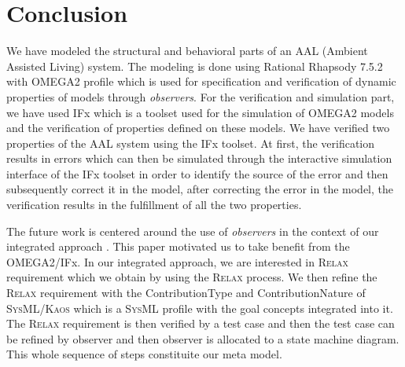 \documentclass[a4paper,twoside]{article}
\def\myrelax{\textsc{Relax}}                  %
\def\sysml{\textsc{SysML}}
\def\kaos{\textsc{Kaos}}
\begin{document}
\section{{Conclusion}\label{conclusion}}
We have modeled the structural and behavioral parts of an AAL (Ambient Assisted Living) system. The modeling is done using Rational Rhapsody 7.5.2  with OMEGA2 profile which is used for specification and verification of dynamic properties of models through \textit{observers}. For the verification and simulation part, we have used IFx which is a toolset used for the simulation of OMEGA2 models and the verification of properties defined on these models. We have verified two properties of the AAL system using the IFx toolset. At first, the verification results in errors which can then be simulated through the interactive simulation interface of the IFx toolset in order to identify the source of the error and then subsequently correct it in the model, after correcting the error in the model, the verification results in the fulfillment of all the two properties. 

The future work is centered around the use of \textit{observers} in the context of our integrated approach \cite{test14}. This paper motivated us to take benefit from the OMEGA2/IFx. In our integrated approach, we are interested in \myrelax{} requirement which we obtain by using the \myrelax{} process. We then refine the \myrelax{} requirement with the ContributionType and ContributionNature of \sysml{}/\kaos{} \cite{test15} which is a \sysml{} profile with the goal concepts integrated into it. The \myrelax{} requirement is then verified by a test case and then the test case can be refined by observer and then observer is allocated to a state machine diagram. This whole sequence of steps constituite our meta model.
\end{document}
